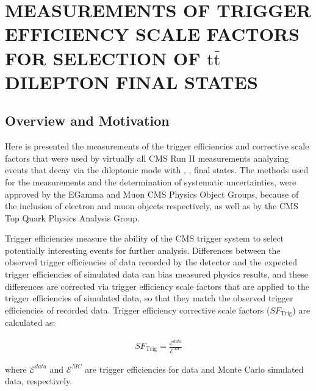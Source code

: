 
\chapter{MEASUREMENTS OF TRIGGER EFFICIENCY SCALE FACTORS FOR SELECTION OF \ensuremath{\mathrm{t\bar{t}}} DILEPTON FINAL STATES}
\label{Trigger_Efficiency_Scale_Factors}

\section{Overview and Motivation}
Here is presented the measurements of the trigger efficiencies and corrective scale factors that were used by virtually all CMS Run II measurements analyzing \ttbar events that decay via the dileptonic mode with \ee, \emu, \mumu final states.  
The methods used for the measurements and the determination of systematic uncertainties, were approved by the EGamma and Muon CMS Physics Object Groups, because of the inclusion of electron and muon objects respectively, as well as by the CMS Top Quark Physics Analysis Group.

Trigger efficiencies measure the ability of the CMS trigger system to select potentially interesting events for further analysis.
Differences between the observed trigger efficiencies of data recorded by the detector and the expected trigger efficiencies of simulated data can bias measured physics results, and these differences are corrected via trigger efficiency scale factors that are applied to the trigger efficiencies of simulated data, so that they match the observed trigger efficiencies of recorded data.
Trigger efficiency corrective scale factors ($SF_{\text{Trig}}$) are calculated as:
\begin{linenomath*}
\begin{align}
SF_{\text{Trig}} = \frac{\mathcal{E}^{data}}{\mathcal{E}^{MC}}
\label{SF}
\end{align}
\end{linenomath*}
where $\mathcal{E}^{data}$ and $\mathcal{E}^{MC}$ are trigger efficiencies for data and Monte Carlo simulated data, respectively.

